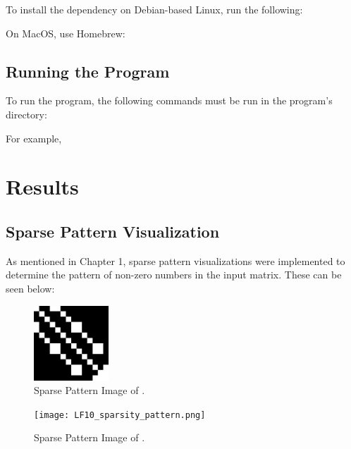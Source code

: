 \documentclass[12pt]{article}
\begin{document}
    To install the dependency on Debian-based Linux, run the following:
    
    

    On MacOS, use Homebrew:
    
    

\subsection{Running the Program}

 To run the program, the following commands must be run in the program's directory:
 
 

 For example, 
 
 

\section{Results}

\subsection{Sparse Pattern Visualization}

As mentioned in Chapter 1, sparse pattern visualizations were implemented to determine the pattern of non-zero numbers in the input matrix. These can be seen below:

\begin{figure}[h]
  \centering
  \includegraphics[width=0.25\textwidth]{LFAT5_sparsity_pattern.png}
  \caption{Sparse Pattern Image of .}
  \label{fig:your_image}
\end{figure}

\begin{figure}[h]
  \centering
  \texttt{[image: LF10\_sparsity\_pattern.png]}
  \caption{Sparse Pattern Image of .}
  \label{fig:your_image}
\end{figure}
\end{document}
